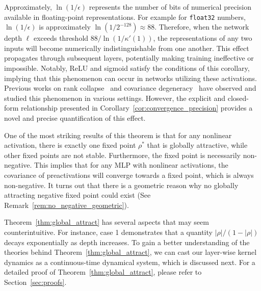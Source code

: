 \documentclass[twoside]{article}
\theoremstyle{definition}
\begin{document}
Approximately, $\ln(1/\epsilon)$ represents the number of bits of numerical precision available in floating-point representations. For example for \texttt{float32} numbers, $\ln(1/\epsilon)$ is approximately $\ln(1/2^{-128}) \approx 88$. Therefore, when the network depth $\ell$ exceeds threshold $88/\ln(1/\kappa'(1))$, the representations of any two inputs will become numerically indistinguishable from one another. This effect propagates through subsequent layers, potentially making training ineffective or impossible. Notably, ReLU and sigmoid satisfy the conditions of this corollary, implying that this phenomenon can occur in networks utilizing these activations. Previous works on rank collapse~\citep{daneshmand2020batch,noci2022signal} and covariance degeneracy~\citep{li2022neural} have observed and studied this phenomenon in various settings. However, the explicit and closed-form relationship presented in Corollary~\ref{cor:convergence_precision} provides a novel and precise quantification of this effect.

One of the most striking results of this theorem is that for any nonlinear activation, there is exactly one fixed point $\rho^*$ that is globally attractive, while other fixed points are not stable. Furthermore, the fixed point is necessarily non-negative. This implies that for any MLP with nonlinear activations, the covariance of preactivations will converge towards a fixed point, which is always non-negative. 
It turns out that there is a geometric reason why no globally attracting negative fixed point could exist (See Remark~\ref{rem:no_negative_geometric}).

Theorem~\ref{thm:global_attract} has several aspects that may seem counterintuitive. For instance, case 1 demonstrates that a quantity $|\rho|/(1-|\rho|)$ decays exponentially as depth increases. To gain a better understanding of the theories behind Theorem~\ref{thm:global_attract}, we can cast our layer-wise kernel dynamics as a continuous-time dynamical system, which is discussed next. For a detailed proof of Theorem~\ref{thm:global_attract}, please refer to Section~\ref{sec:proofs}.
\end{document}

